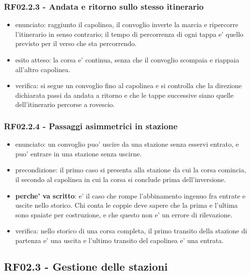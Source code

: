 \documentclass[11pt]{article}
\begin{document}
\subsubsection{RF02.2.3 - Andata e ritorno sullo stesso itinerario}
\label{sec:orge833fc0}
\begin{itemize}
\item enunciato: raggiunto il capolinea, il convoglio inverte la marcia e ripercorre l'itinerario in
senso contrario; il tempo di percorrenza di ogni tappa e' quello previsto per il verso che sta
percorrendo.
\item esito atteso: la corsa e' continua, senza che il convoglio scompaia e riappaia all'altro capolinea.
\item verifica: si segue un convoglio fino al capolinea e si controlla che la direzione dichiarata passi
da andata a ritorno e che le tappe successive siano quelle dell'itinerario percorse a rovescio.
\end{itemize}
\subsubsection{RF02.2.4 - Passaggi asimmetrici in stazione}
\label{sec:org678c0c0}
\begin{itemize}
\item enunciato: un convoglio puo' uscire da una stazione senza esservi entrato, e puo' entrare in una
stazione senza uscirne.
\item precondizione: il primo caso si presenta alla stazione da cui la corsa comincia, il secondo al
capolinea in cui la corsa si conclude prima dell'inversione.
\item \textbf{perche' va scritto}: e' il caso che rompe l'abbinamento ingenuo fra entrate e uscite nello
storico. Chi conta le coppie deve sapere che la prima e l'ultima sono spaiate per costruzione, e
che questo non e' un errore di rilevazione.
\item verifica: nello storico di una corsa completa, il primo transito della stazione di partenza e' una
uscita e l'ultimo transito del capolinea e' una entrata.
\end{itemize}
\subsection{RF02.3 - Gestione delle stazioni}
\label{sec:org634fdaa}
\end{document}
